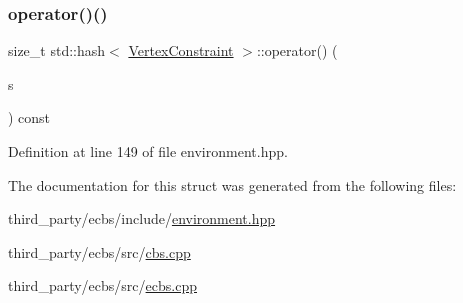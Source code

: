 \subsubsection{\texorpdfstring{operator()()}{operator()()}\hspace{0.1cm}{\footnotesize\ttfamily [3/3]}}
{\footnotesize\ttfamily size\+\_\+t std\+::hash$<$ \hyperlink{structlib_multi_robot_planning_1_1_vertex_constraint}{Vertex\+Constraint} $>$\+::operator() (\begin{DoxyParamCaption}\item[{const \hyperlink{structlib_multi_robot_planning_1_1_vertex_constraint}{Vertex\+Constraint} \&}]{s }\end{DoxyParamCaption}) const\hspace{0.3cm}{\ttfamily [inline]}}



Definition at line 149 of file environment.\+hpp.



The documentation for this struct was generated from the following files\+:\begin{DoxyCompactItemize}
\item 
third\+\_\+party/ecbs/include/\hyperlink{environment_8hpp}{environment.\+hpp}\item 
third\+\_\+party/ecbs/src/\hyperlink{cbs_8cpp}{cbs.\+cpp}\item 
third\+\_\+party/ecbs/src/\hyperlink{ecbs_8cpp}{ecbs.\+cpp}\end{DoxyCompactItemize}

